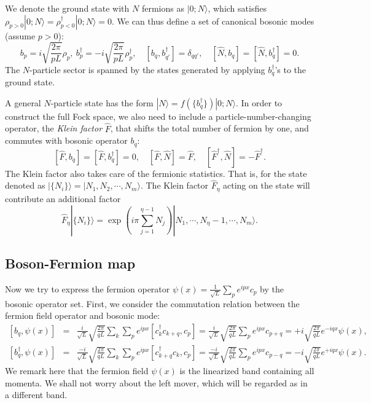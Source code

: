 \documentclass[aps,prb,superscriptaddress,nofootinbib]{revtex4}
\begin{document}
We denote the ground state with $N$ fermions as $|0;N\rangle$, which satisfies $\rho_{p>0}|0;N\rangle = \rho^\dagger_{p<0}|0;N\rangle = 0$.
We can thus define a set of canonical bosonic modes (assume $p>0$):
\begin{equation}
	b_p = i \sqrt{\frac{2\pi}{pL}}\rho_p,\ 
	b_p^\dagger = -i\sqrt{\frac{2\pi}{pL}}\rho_p^\dagger, \quad
	[b_q,b_{q'}^\dagger] = \delta_{qq'},\quad
	[\hat N, b_q] = [\hat N, b_q^\dagger] = 0.
\end{equation}
The $N$-particle sector is spanned by the states generated by applying $b_q^\dagger$'s to the ground state.

A general $N$-particle state has the form $|N\rangle = f(\{b_q^\dagger\})|0;N\rangle$.
In order to construct the full Fock space, we also need to include a particle-number-changing operator, the \textit{Klein factor} $\hat F$, that shifts the total number of fermion by one, and commutes with bosonic operator $b_q$:
\begin{equation}
	\left[\hat F, b_q \right] = \left[\hat F, b_q^\dagger \right] = 0, \quad
	\left[\hat F, \hat N \right] = \hat F, \quad 
	\left[\hat F^\dagger, \hat N \right] = -\hat F^\dagger.
\end{equation}
The Klein factor also takes care of the fermionic statistics. 
That is, for the state denoted as $|\{N_i\}\rangle = |N_1,N_2,\cdots,N_m\rangle$.
The Klein factor $\hat F_\eta$ acting on the state will contribute an additional factor
\begin{equation*}
	\hat F_\eta|\{N_i\}\rangle = \exp\left(i\pi\sum_{j=1}^{\eta-1}N_j\right)|N_1,\cdots,N_\eta-1,\cdots,N_m\rangle.
\end{equation*}



\subsection{Boson-Fermion map}
Now we try to express the fermion operator $\psi(x) = \frac{1}{\sqrt{L}} \sum_p e^{ipx} c_{p}$
by the bosonic operator set.
First, we consider the commutation relation between the fermion field operator and bosonic mode:
\begin{eqnarray}
	\left[b_q,\psi(x)\right] 
	&=& \frac{i}{\sqrt L}\sqrt{\frac{2\pi}{qL}}\sum_{k}\sum_{p} e^{ipx} [c^\dagger_{k}c_{k+q},c_{p}] 
	= \frac{i}{\sqrt L} \sqrt{\frac{2\pi}{qL}} \sum_{p} e^{ipx} c_{p+q} 
	= +i\sqrt{\frac{2\pi}{qL}} e^{-iqx} \psi(x), \label{eq:bs-comm-1} \\ 
	\left[b_q^\dagger,\psi(x)\right] 
	&=& \frac{-i}{\sqrt L}\sqrt{\frac{2\pi}{qL}}\sum_{k}\sum_{p} e^{ipx} [c^\dagger_{k+q}c_{k},c_{p}] 
	= \frac{-i}{\sqrt L} \sqrt{\frac{2\pi}{qL}} \sum_{p} e^{ipx} c_{p-q} 
	= -i\sqrt{\frac{2\pi}{qL}} e^{+iqx}\psi(x). \label{eq:bs-comm-2}
\end{eqnarray}
We remark here that the fermion field $\psi(x)$ is the linearized band containing all momenta.
We shall not worry about the left mover, which will be regarded as in a different band.
\end{document}
